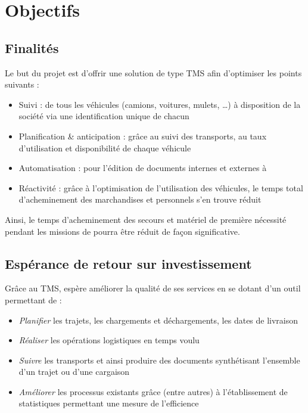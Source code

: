 
\section{Objectifs}
\subsection{Finalités}
Le but du projet est d'offrir une solution de type TMS afin d'optimiser les points suivants :
\begin{itemize}
\item Suivi : de tous les véhicules (camions, voitures, mulets, …) à disposition de la société via une identification unique de chacun
\item Planification \& anticipation : grâce au suivi des transports, au taux d'utilisation et disponibilité de chaque véhicule
\item Automatisation : pour l'édition de documents internes et externes à \mo
\item Réactivité : grâce à l'optimisation de l'utilisation des véhicules, le temps total d'acheminement des marchandises et personnels s'en trouve réduit
\end{itemize}
Ainsi, le temps d'acheminement des secours et matériel de première nécessité pendant les missions de \mo pourra être réduit de façon significative.

\subsection{Espérance de retour sur investissement}
Grâce au TMS, \mo espère améliorer la qualité de ses services en se dotant d'un outil permettant de :
\begin{itemize}
	\item \emph{Planifier} les trajets, les chargements et déchargements, les dates de livraison
	\item \emph{Réaliser} les opérations logistiques en temps voulu
	\item \emph{Suivre} les transports et ainsi produire des documents synthétisant l'ensemble d'un trajet ou d'une cargaison
	\item \emph{Améliorer} les processus existants grâce (entre autres) à l'établissement de statistiques permettant une mesure de l'efficience
\end{itemize}

